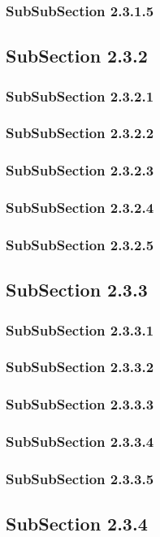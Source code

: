 \subsubsection{SubSubSection 2.3.1.5}
\subsection{SubSection 2.3.2}
\subsubsection{SubSubSection 2.3.2.1}
\subsubsection{SubSubSection 2.3.2.2}
\subsubsection{SubSubSection 2.3.2.3}
\subsubsection{SubSubSection 2.3.2.4}
\subsubsection{SubSubSection 2.3.2.5}
\subsection{SubSection 2.3.3}
\subsubsection{SubSubSection 2.3.3.1}
\subsubsection{SubSubSection 2.3.3.2}
\subsubsection{SubSubSection 2.3.3.3}
\subsubsection{SubSubSection 2.3.3.4}
\subsubsection{SubSubSection 2.3.3.5}
\subsection{SubSection 2.3.4}
